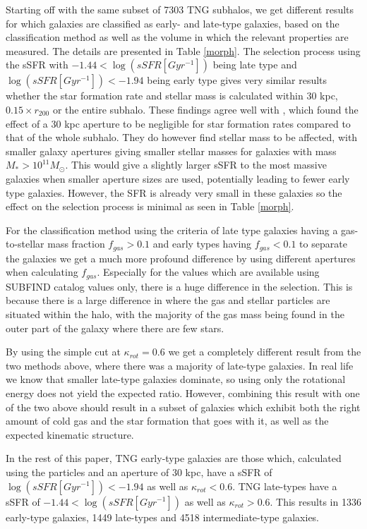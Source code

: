 Starting off with the same subset of 7303 TNG subhalos, we get different results for which galaxies are classified as early- and late-type galaxies, based on the classification method as well as the volume in which the relevant properties are measured. The details are presented in Table \ref{morph}. The selection process using the sSFR with $ -1.44 < \log (sSFR[Gyr^{-1}]) $ being late type and $\log (sSFR[Gyr^{-1}]) < -1.94$ being early type gives very similar results whether the star formation rate and stellar mass is calculated within 30 kpc, $0.15 \times r_{200}$ or the entire subhalo. These findings agree well with \textcite{Schaye2015}, which found the effect of a 30 kpc aperture to be negligible for star formation rates compared to that of the whole subhalo. They do however find stellar mass to be affected, with smaller galaxy apertures giving smaller stellar masses for galaxies with mass $M_* > 10^{11}M_{\odot}$. This would give a slightly larger sSFR to the most massive galaxies when smaller aperture sizes are used, potentially leading to fewer early type galaxies. However, the SFR is already very small in these galaxies so the effect on the selection process is minimal as seen in Table \ref{morph}.

For the classification method using the criteria of late type galaxies having a gas-to-stellar mass fraction $f_{gas} > 0.1$ and early types having $f_{gas} < 0.1$ to separate the galaxies we get a much more profound difference by using different apertures when calculating $f_{gas}$. Especially for the values which are available using SUBFIND catalog values only, there is a huge difference in the selection. This is because there is a large difference in where the gas and stellar particles are situated within the halo, with the majority of the gas mass being found in the outer part of the galaxy where there are few stars.

By using the simple cut at $\kappa_{rot} = 0.6$ we get a completely different result from the two methods above, where there was a majority of late-type galaxies. In real life we know that smaller late-type galaxies dominate, so using only the rotational energy does not yield the expected ratio. However, combining this result with one of the two above should result in a subset of galaxies which exhibit both the right amount of cold gas and the star formation that goes with it, as well as the expected kinematic structure.

In the rest of this paper, TNG early-type galaxies are those which, calculated using the particles and an aperture of 30 kpc, have a sSFR of $\log (sSFR[Gyr^{-1}]) < -1.94$ as well as $\kappa_{rot} < 0.6$. TNG late-types have a sSFR of $ -1.44 < \log (sSFR[Gyr^{-1}]) $ as well as $\kappa_{rot} > 0.6$. This results in 1336 early-type galaxies, 1449 late-types and 4518 intermediate-type galaxies.

